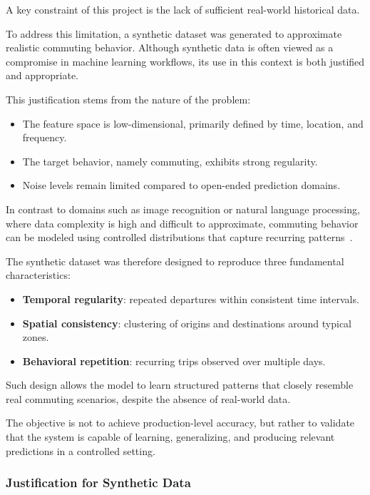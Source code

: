 A key constraint of this project is the lack of sufficient real-world historical data.

To address this limitation, a synthetic dataset was generated to approximate realistic commuting behavior. Although synthetic data is often viewed as a compromise in machine learning workflows, its use in this context is both justified and appropriate.

This justification stems from the nature of the problem:

\begin{itemize}
    \item The feature space is low-dimensional, primarily defined by time, location, and frequency.
    \item The target behavior, namely commuting, exhibits strong regularity.
    \item Noise levels remain limited compared to open-ended prediction domains.
\end{itemize}

In contrast to domains such as image recognition or natural language processing, where data complexity is high and difficult to approximate, commuting behavior can be modeled using controlled distributions that capture recurring patterns~\cite{mitchell1997machine}.

The synthetic dataset was therefore designed to reproduce three fundamental characteristics:

\begin{itemize}
    \item \textbf{Temporal regularity}: repeated departures within consistent time intervals.
    \item \textbf{Spatial consistency}: clustering of origins and destinations around typical zones.
    \item \textbf{Behavioral repetition}: recurring trips observed over multiple days.
\end{itemize}

Such design allows the model to learn structured patterns that closely resemble real commuting scenarios, despite the absence of real-world data.

The objective is not to achieve production-level accuracy, but rather to validate that the system is capable of learning, generalizing, and producing relevant predictions in a controlled setting.

\subsubsection{Justification for Synthetic Data}

